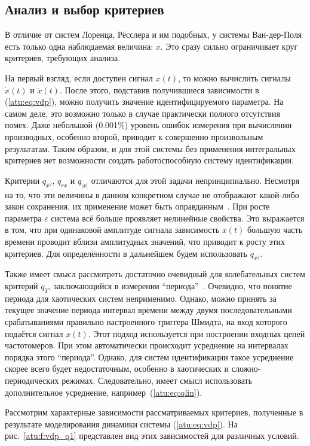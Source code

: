 \subsection{Анализ и выбор критериев}  %

В отличие от систем Лоренца, Рёсслера и им подобных,
у системы Ван-дер-Поля есть только одна наблюдаемая величина: $x$.
Это сразу сильно ограничивает круг критериев, требующих анализа.

На первый взгляд, если доступен сигнал $x(t)$,
то можно вычислить сигналы $\dot{x}(t)$ и $\ddot{x}(t)$.
После этого, подставив получившиеся зависимости в (\ref{atu:eq:vdp}),
можно получить значение идентифицируемого параметра.
На самом деле, это возможно только в случае практически полного отсутствия помех.
Даже небольшой  (0.001\%) уровень ошибок измерения
при вычислении производных, особенно второй,
приводит к совершенно произвольным результатам.
Таким образом, и для этой системы без применения
интегральных критериев нет возможности создать работоспособную систему идентификации.

Критерии $q_{x^2}$, $q_{rx}$ и $q_{|x|}$ отличаются
для этой задачи непринципиально.
Несмотря на то, что эти величины в данном конкретном случае не
отображают какой-либо закон сохранения, их применение может быть оправданным~\cite{atu_asau17}.
При росте параметра $\varepsilon$ система всё больше проявляет нелинейные свойства.
Это выражается в том, что при одинаковой амплитуде сигнала
зависимость $x(t)$ большую часть времени проводит вблизи
амплитудных значений, что приводит к росту этих критериев.
Для определённости в дальнейшем будем использовать $q_{x^2}$.

Также имеет смысл рассмотреть достаточно очевидный для
колебательных систем критерий $q_T$,
заключающийся в измерении ``периода''~\cite{atu_asau16}.
Очевидно, что понятие периода для хаотических систем неприменимо.
Однако, можно принять за текущее значение периода
интервал времени между двумя последовательными срабатываниями
правильно настроенного триггера Шмидта, на вход которого подаётся сигнал
$x(t)$. Этот подход используется при построении входных
цепей частотомеров. При этом автоматически происходит усреднение
на интервалах порядка этого ``периода''. Однако,
для систем идентификации такое усреднение скорее всего будет
недостаточным, особенно в хаотических и сложно-периодических
режимах. Следовательно, имеет смысл использовать дополнительное
усреднение, например~(\ref{atu:eq:qlin}).

Рассмотрим характерные зависимости рассматриваемых критериев,
полученные в результате моделирования динамики системы (\ref{atu:eq:vdp}).
На  рис.~\ref{atu:f:vdp_q1} представлен вид этих зависимостей
для различных условий.


